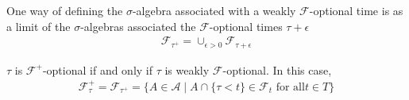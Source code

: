 One way of defining the $\sigma$-algebra associated with a weakly
$\mathcal{F}$-optional time is as a limit of the $\sigma$-algebras
associated the $\mathcal{F}$-optional times $\tau + \epsilon$
\begin{align*}
\mathcal{F}_{\tau^+} = \cup_{\epsilon > 0} \mathcal{F}_{\tau + \epsilon}
\end{align*}
\begin{lem}\label{WeaklyOptionalCharacterization}$\tau$ is $\mathcal{F}^+$-optional if and only if $\tau$ is
  weakly $\mathcal{F}$-optional.  In this case, 
\begin{align*}
\mathcal{F}^+_\tau = \mathcal{F}_{\tau^+} = \lbrace A \in \mathcal{A}
\mid A \cap \lbrace \tau < t \rbrace \in \mathcal{F}_t \text { for all
} t \in T \rbrace
\end{align*}
\end{lem}
